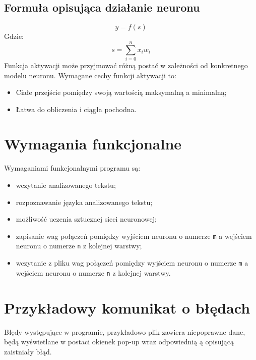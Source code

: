 \documentclass[8pt]{article}
\begin{document}
\subsection{Formuła opisująca działanie neuronu}
\begin{equation}
y = f(s)  
\end{equation}
\hspace*{1 cm} Gdzie:
\begin{equation}
s=\sum \limits_{i=0}^{n} x_i  w_i 
\end{equation}
\hspace*{1 cm} Funkcja aktywacji może przyjmować różną postać w zależności od konkretnego modelu neuronu.
\newline \hspace*{1 cm} Wymagane cechy funkcji aktywacji  to:
\begin{itemize}
\item Ciałe przejście pomiędzy swoją wartością maksymalną a minimalną;
\item Łatwa do obliczenia i ciągła pochodna.
\end{itemize}
\section{Wymagania funkcjonalne}
\hspace*{1 cm} Wymaganiami funkcjonalnymi programu są: 
\begin{itemize}
\item wczytanie analizowanego tekstu;
\item rozpoznawanie języka analizowanego tekstu;
\item możliwość uczenia sztucznej sieci neuronowej;
\item zapisanie wag połączeń pomiędzy wyjściem neuronu o numerze \texttt{m} a wejściem neuronu o numerze \texttt{n} z kolejnej warstwy;
\item wczytanie z pliku wag  połączeń pomiędzy wyjściem neuronu o numerze \texttt{m} a wejściem neuronu o numerze \texttt{n}  z kolejnej warstwy.
\end{itemize}
\section{Przykładowy komunikat o błędach}
\hspace*{1 cm} Błędy występujące w programie, przykładowo plik zawiera niepoprawne dane, będą wyświetlane w postaci okienek pop-up wraz odpowiednią 
ą opisującą zaistniały błąd.\newline
\end{document}

